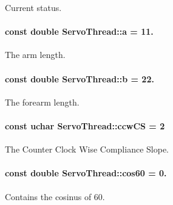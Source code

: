 Current status. 

\hypertarget{a00009_a7dc3998d380d61406fe4485f9872edff}{}
\paragraph[{a}]{\setlength{\rightskip}{0pt plus 5cm}const double Servo\+Thread\+::a = 11.\hspace{0.3cm}{\ttfamily [private]}}\label{a00009_a7dc3998d380d61406fe4485f9872edff}


The arm length. 

\hypertarget{a00009_a14f03febaa39a60b9bf7ff9b9151060c}{}
\paragraph[{b}]{\setlength{\rightskip}{0pt plus 5cm}const double Servo\+Thread\+::b = 22.\hspace{0.3cm}{\ttfamily [private]}}\label{a00009_a14f03febaa39a60b9bf7ff9b9151060c}


The forearm length. 

\hypertarget{a00009_ac2d1087cd0cc45ef71c77aa20b41ceda}{}
\paragraph[{ccw\+C\+S}]{\setlength{\rightskip}{0pt plus 5cm}const uchar Servo\+Thread\+::ccw\+C\+S = 2\hspace{0.3cm}{\ttfamily [private]}}\label{a00009_ac2d1087cd0cc45ef71c77aa20b41ceda}


The Counter Clock Wise Compliance Slope. 

\hypertarget{a00009_a86dc58ff23326f939cd6fb610ac90d53}{}
\paragraph[{cos60}]{\setlength{\rightskip}{0pt plus 5cm}const double Servo\+Thread\+::cos60 = 0.\hspace{0.3cm}{\ttfamily [private]}}\label{a00009_a86dc58ff23326f939cd6fb610ac90d53}


Contains the cosinus of 60. 

